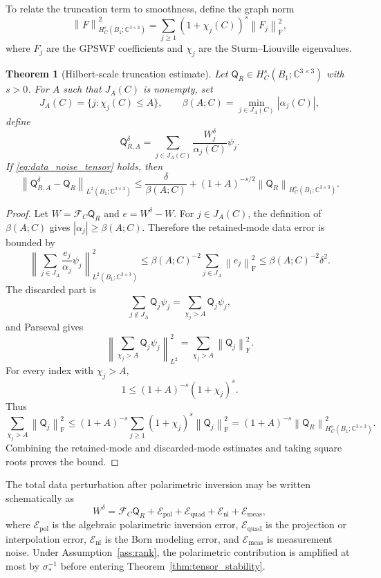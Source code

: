 \documentclass[11pt]{article}
\numberwithin{equation}{section}
\newcommand{\C}{\mathbb{C}}
\newcommand{\tens}[1]{\bm{\mathsf{#1}}}
\newcommand{\F}{\mathcal{F}}
\newcommand{\Qt}{\ensuremath{\tens{Q}}}
\newcommand{\abs}[1]{\left\lvert #1\right\rvert}
\newcommand{\norm}[1]{\left\lVert #1\right\rVert}
\newcommand{\Frob}{\mathrm F}
\theoremstyle{plain}
\newtheorem{theorem}{Theorem}[section]
\theoremstyle{definition}
\begin{document}
To relate the truncation term to smoothness, define the graph norm
\begin{equation*}
  \norm{F}_{H_C^s(B_1;\C^{3\times3})}^2
  =\sum_{j\ge1}(1+\chi_j(C))^s\norm{F_j}_{\Frob}^2,
\end{equation*}
where $F_j$ are the GPSWF coefficients and $\chi_j$ are the Sturm--Liouville eigenvalues.

\begin{theorem}[Hilbert-scale truncation estimate]\label{thm:hilbert}
Let $\Qt_R\in H_C^s(B_1;\C^{3\times3})$ with $s>0$.  For $A$ such that $J_A(C)$ is nonempty, set
\begin{equation*}
  J_A(C)=\{j:\chi_j(C)\le A\},
  \qquad
  \beta(A;C)=\min_{j\in J_A(C)}\abs{\alpha_j(C)},
\end{equation*}
define
\begin{equation*}
  \Qt_{R,A}^\delta=
  \sum_{j\in J_A(C)}\frac{W_j^\delta}{\alpha_j(C)}\psi_j .
\end{equation*}
If \eqref{eq:data_noise_tensor} holds, then
\begin{equation*}
  \norm{\Qt_{R,A}^\delta-\Qt_R}_{L^2(B_1;\C^{3\times3})}
  \le \frac{\delta}{\beta(A;C)}+(1+A)^{-s/2}\norm{\Qt_R}_{H_C^s(B_1;\C^{3\times3})}.
\end{equation*}
\end{theorem}

\begin{proof}
Let \(W=\F_C\Qt_R\) and \(e=W^\delta-W\).  For \(j\in J_A(C)\), the definition of \(\beta(A;C)\) gives \(\abs{\alpha_j}\ge \beta(A;C)\).  Therefore the retained-mode data error is bounded by
\[
  \left\|\sum_{j\in J_A}\frac{e_j}{\alpha_j}\psi_j\right\|_{L^2(B_1;\C^{3\times3})}^2
  \le \beta(A;C)^{-2}\sum_{j\in J_A}\norm{e_j}_{\Frob}^2
  \le \beta(A;C)^{-2}\delta^2 .
\]
The discarded part is
\[
  \sum_{j\notin J_A}\tens{Q}_j\psi_j
  =\sum_{\chi_j>A}\tens{Q}_j\psi_j,
\]
and Parseval gives
\[
  \left\|\sum_{\chi_j>A}\tens{Q}_j\psi_j\right\|_{L^2}^2
  =\sum_{\chi_j>A}\norm{\tens{Q}_j}_{\Frob}^2 .
\]
For every index with \(\chi_j>A\),
\[
  1\le (1+A)^{-s}(1+\chi_j)^s .
\]
Thus
\[
  \sum_{\chi_j>A}\norm{\tens{Q}_j}_{\Frob}^2
  \le (1+A)^{-s}\sum_{j\ge1}(1+\chi_j)^s\norm{\tens{Q}_j}_{\Frob}^2
  =(1+A)^{-s}\norm{\Qt_R}_{H_C^s(B_1;\C^{3\times3})}^2 .
\]
Combining the retained-mode and discarded-mode estimates and taking square roots proves the bound.
\end{proof}

The total data perturbation after polarimetric inversion may be written schematically as
\begin{equation}\label{eq:total_data_perturbation}
  W^\delta=\F_C\Qt_R+\mathcal{E}_{\mathrm{pol}}+\mathcal{E}_{\mathrm{quad}}+\mathcal{E}_{\mathrm{nl}}+\mathcal{E}_{\mathrm{meas}},
\end{equation}
where $\mathcal{E}_{\mathrm{pol}}$ is the algebraic polarimetric inversion error, $\mathcal{E}_{\mathrm{quad}}$ is the projection or interpolation error, $\mathcal{E}_{\mathrm{nl}}$ is the Born modeling error, and $\mathcal{E}_{\mathrm{meas}}$ is measurement noise.  Under Assumption~\ref{ass:rank}, the polarimetric contribution is amplified at most by $\sigma_*^{-1}$ before entering Theorem~\ref{thm:tensor_stability}.
\end{document}
